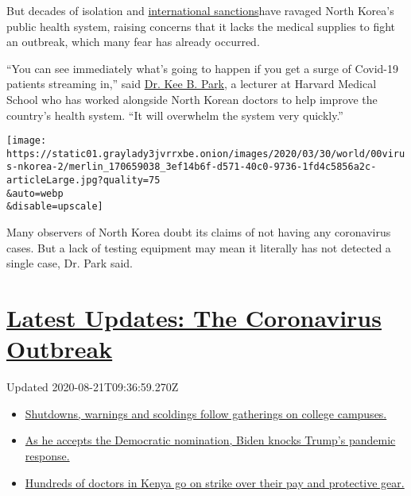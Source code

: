 But decades of isolation and
\href{https://www.nytimes3xbfgragh.onion/2019/04/18/world/asia/north-korea-economy-sanctions.html}{international
sanctions}have ravaged​ North Korea's public health system, raising
concerns that ​it lacks the medical supplies to fight an outbreak, which
many fear has already occurred.

``You can see immediately what's going to happen if you get a surge of
Covid-19 patients streaming in,'' said
\href{https://ghsm.hms.harvard.edu/faculty-staff/kee-b-park}{Dr. Kee B.
Park,} ​a ​lecturer at Harvard Medical School who has worked alongside
North Korean doctors to help improve the country's health system. ``It
will overwhelm the system very quickly.''

\texttt{[image: https://static01.graylady3jvrrxbe.onion/images/2020/03/30/world/00virus-nkorea-2/merlin\_170659038\_3ef14b6f-d571-40c0-9736-1fd4c5856a2c-articleLarge.jpg?quality=75\\\&auto=webp\\\&disable=upscale]}

Many observers of North Korea doubt its claims of not having any
coronavirus cases. But a lack of testing ​equipment ​​may mean it
literally has not detected a single case​, Dr. Park said​.

\hypertarget{latest-updates-the-coronavirus-outbreak}{%
\section{\texorpdfstring{\href{https://www.nytimes3xbfgragh.onion/2020/08/21/world/covid-19-coronavirus.html?action=click\&pgtype=Article\&state=default\&region=MAIN_CONTENT_1\&context=storylines_live_updates}{Latest
Updates: The Coronavirus
Outbreak}}{Latest Updates: The Coronavirus Outbreak}}\label{latest-updates-the-coronavirus-outbreak}}

Updated 2020-08-21T09:36:59.270Z

\begin{itemize}
\tightlist
\item
  \href{https://www.nytimes3xbfgragh.onion/2020/08/21/world/covid-19-coronavirus.html?action=click\&pgtype=Article\&state=default\&region=MAIN_CONTENT_1\&context=storylines_live_updates\#link-4690b6aa}{Shutdowns,
  warnings and scoldings follow gatherings on college campuses.}
\item
  \href{https://www.nytimes3xbfgragh.onion/2020/08/21/world/covid-19-coronavirus.html?action=click\&pgtype=Article\&state=default\&region=MAIN_CONTENT_1\&context=storylines_live_updates\#link-324af071}{As
  he accepts the Democratic nomination, Biden knocks Trump's pandemic
  response.}
\item
  \href{https://www.nytimes3xbfgragh.onion/2020/08/21/world/covid-19-coronavirus.html?action=click\&pgtype=Article\&state=default\&region=MAIN_CONTENT_1\&context=storylines_live_updates\#link-35890b73}{Hundreds
  of doctors in Kenya go on strike over their pay and protective gear.}
\end{itemize}

